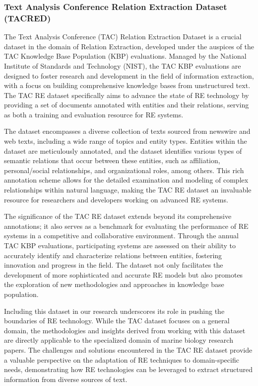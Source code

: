 \subsubsection{Text Analysis Conference Relation Extraction Dataset (TACRED)}
\label{sec:tacreddataset}
The Text Analysis Conference (TAC) Relation Extraction Dataset is a crucial dataset in the domain of Relation Extraction, developed under the auspices of the TAC Knowledge Base Population (KBP) evaluations. Managed by the National Institute of Standards and Technology (NIST), the TAC KBP evaluations are designed to foster research and development in the field of information extraction, with a focus on building comprehensive knowledge bases from unstructured text\cite{TAC}. The TAC RE dataset specifically aims to advance the state of RE technology by providing a set of documents annotated with entities and their relations, serving as both a training and evaluation resource for RE systems.

The dataset encompasses a diverse collection of texts sourced from newswire and web texts, including a wide range of topics and entity types. Entities within the dataset are meticulously annotated, and the dataset identifies various types of semantic relations that occur between these entities, such as affiliation, personal/social relationships, and organizational roles, among others. This rich annotation scheme allows for the detailed examination and modeling of complex relationships within natural language, making the TAC RE dataset an invaluable resource for researchers and developers working on advanced RE systems.

The significance of the TAC RE dataset extends beyond its comprehensive annotations; it also serves as a benchmark for evaluating the performance of RE systems in a competitive and collaborative environment. Through the annual TAC KBP evaluations, participating systems are assessed on their ability to accurately identify and characterize relations between entities, fostering innovation and progress in the field. The dataset not only facilitates the development of more sophisticated and accurate RE models but also promotes the exploration of new methodologies and approaches in knowledge base population.

Including this dataset in our research underscores its role in pushing the boundaries of RE technology. While the TAC dataset focuses on a general domain, the methodologies and insights derived from working with this dataset are directly applicable to the specialized domain of marine biology research papers. The challenges and solutions encountered in the TAC RE dataset provide a valuable perspective on the adaptation of RE techniques to domain-specific needs, demonstrating how RE technologies can be leveraged to extract structured information from diverse sources of text.

